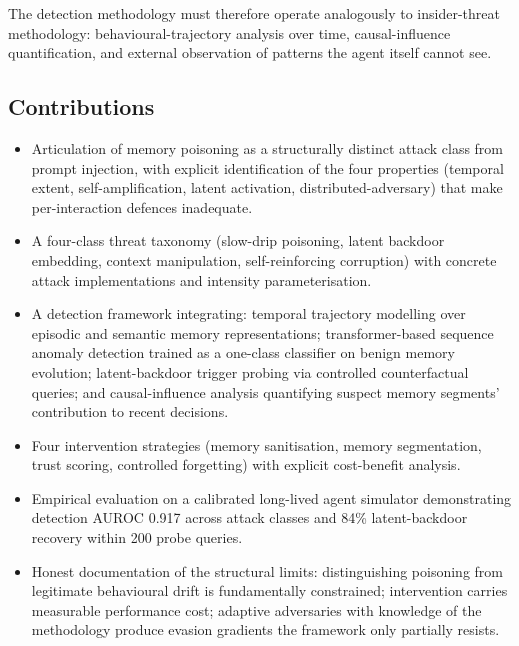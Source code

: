 \documentclass[sigconf,nonacm]{acmart}
\begin{document}
The detection methodology must therefore operate analogously to
insider-threat methodology: behavioural-trajectory analysis over
time, causal-influence quantification, and external observation of
patterns the agent itself cannot see.

\subsection{Contributions}

\begin{itemize}
  \item Articulation of memory poisoning as a structurally distinct
        attack class from prompt injection, with explicit
        identification of the four properties (temporal extent,
        self-amplification, latent activation, distributed-adversary)
        that make per-interaction defences inadequate.
  \item A four-class threat taxonomy (slow-drip poisoning, latent
        backdoor embedding, context manipulation, self-reinforcing
        corruption) with concrete attack implementations and
        intensity parameterisation.
  \item A detection framework integrating: temporal trajectory
        modelling over episodic and semantic memory representations;
        transformer-based sequence anomaly detection trained as a
        one-class classifier on benign memory evolution;
        latent-backdoor trigger probing via controlled counterfactual
        queries; and causal-influence analysis quantifying suspect
        memory segments' contribution to recent decisions.
  \item Four intervention strategies (memory sanitisation, memory
        segmentation, trust scoring, controlled forgetting) with
        explicit cost-benefit analysis.
  \item Empirical evaluation on a calibrated long-lived agent
        simulator demonstrating detection AUROC 0.917 across attack
        classes and 84\% latent-backdoor recovery within 200 probe
        queries.
  \item Honest documentation of the structural limits: distinguishing
        poisoning from legitimate behavioural drift is fundamentally
        constrained; intervention carries measurable performance
        cost; adaptive adversaries with knowledge of the methodology
        produce evasion gradients the framework only partially
        resists.
\end{itemize}
\end{document}
